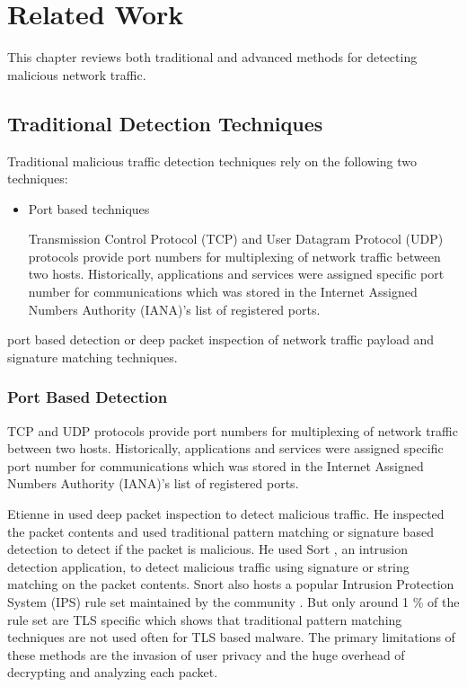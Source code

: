 \chapter{Related Work\label{chap:related}}

This chapter reviews both traditional and advanced methods for detecting malicious network traffic.


\section{Traditional Detection Techniques}

Traditional malicious traffic detection techniques rely on the following two techniques:
\begin{itemize}
	\item Port based techniques
	
	Transmission Control Protocol (TCP) and User Datagram Protocol (UDP) protocols provide port numbers for multiplexing of network traffic between two hosts. Historically, applications and services were assigned specific port number for communications which was stored in the Internet Assigned Numbers Authority (IANA)’s list of registered ports.
	
\end{itemize}
port based detection or deep packet inspection of network traffic payload and signature matching techniques. 


\subsection{Port Based Detection}

TCP and UDP protocols provide port numbers for multiplexing of network traffic between two hosts. Historically, applications and services were assigned specific port number for communications which was stored in the Internet Assigned Numbers Authority (IANA)'s list of registered ports.  

Etienne in \cite{Etienne} used deep packet inspection to detect malicious traffic. He inspected the packet contents and used traditional pattern matching or signature based detection to detect if the packet is malicious. He used Sort \cite{Snort}, an intrusion detection application, to detect malicious traffic using signature or string matching on the packet contents. Snort also hosts a popular Intrusion Protection System (IPS) rule set maintained by the community \cite{SnortCR}. But only around 1 \% of the rule set are TLS specific which shows that traditional pattern matching techniques are not used often for TLS based malware. The primary limitations of these methods are the invasion of user privacy and the huge overhead of decrypting and analyzing each packet.

